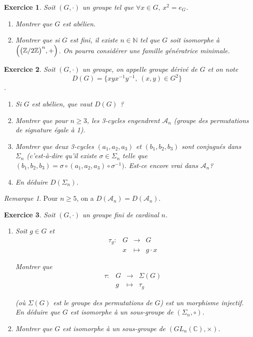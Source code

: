 \documentclass[12pt]{article}
\newtheorem{exercise}{Exercice}[section]
\theoremstyle{remark}
\theoremstyle{remark}
\newtheorem{remark}{Remarque}
\newcommand{\C}{\mathbb{C}}
\newcommand{\N}{\mathbb{N}}
\newcommand{\Z}{\mathbb{Z}}
\newcommand{\function}[5]{
	$$
	\begin{array}{rccl}
		#1: & #2 & \to & #3 \\
		& #4 & \mapsto & #5
	\end{array}
	$$
}
\begin{document}
\begin{exercise}
	Soit $(G,\cdot)$ un groupe tel que $\forall x\in G,~x^2=e_{G}$.
	\begin{enumerate}
		\item Montrer que $G$ est abélien.
		\item Montrer que si $G$ est fini, il existe $n\in\N$ tel que $G$ soit
		isomorphe à $\Bigl(\bigl(\Z/2\Z\bigr)^n,+\Bigr)$. On pourra considérer
		une famille génératrice minimale.
	\end{enumerate}
\end{exercise}

\begin{exercise}
	Soit $(G,\cdot)$ un groupe, on appelle groupe dérivé de $G$ et on note
	$$D(G)=\{xyx^{-1}y^{-1},~(x,y)\in G^{2}\}$$.
	\begin{enumerate}
		\item Si $G$ est abélien, que vaut $D(G)$ ?
		\item Montrer que pour $n\geqslant3$, les 3-cycles engendrent
		$\mathcal{A}_{n}$ (groupe des permutations de signature égale à 1).
		\item Montrer que deux 3-cycles $(a_{1},a_{2},a_{3})$ et
		$(b_{1},b_{2},b_{3})$ sont conjugués dans $\Sigma_{n}$ (c'est-à-dire
		qu'il existe $\sigma\in\Sigma_{n}$ telle que
		$(b_{1},b_{2},b_{3})=\sigma\circ(a_{1},a_{2},a_{3})\circ\sigma^{-1})$.
		Est-ce encore vrai dans $\mathcal{A}_{n}$?
		\item En déduire $D(\Sigma_{n})$.
	\end{enumerate}
\end{exercise}

\begin{remark}
	Pour $n\geqslant 5$, on a $D(\mathcal{A}_{n})=D(\mathcal{A}_{n})$.
\end{remark}

\begin{exercise}
	Soit $(G,\cdot)$ un groupe fini de cardinal $n$.
	\begin{enumerate}
		\item Soit $g\in G$ et \function{\tau_g}{G}{G}{x}{g\cdot x}
		Montrer que \function{\tau}{G}{\Sigma(G)}{g}{\tau_g} 
		(où $\Sigma(G)$ est le groupe des permutations de $G$) est un morphisme
		injectif. En déduire que $G$ est isomorphe à un sous-groupe de
		$(\Sigma_{n},\circ)$.
		\item Montrer que $G$ est isomorphe à un sous-groupe de $(GL_{n}(\C),\times)$.
	\end{enumerate}
\end{exercise}
\end{document}
